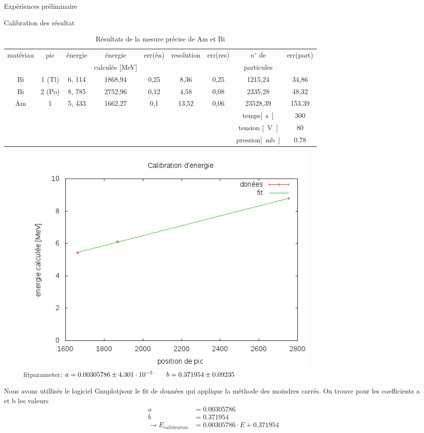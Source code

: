 \documentclass[a4paper,11pt]{scrartcl}
\begin{document}
\begin{section}{Expériences préliminaire}
  \begin{subsection}{Calibration des résultat}
   \begin{table}[htbp]
    \caption{Résultats de la mesure précise de Am et Bi}
    \begin{center}
     \begin{tabular}{|c||c||c||c|c|c|c|c|c|}
      \hline 
      matériau	&	pic	& énergie  &	énergie	&	err(én)	&	resolution	&	err(res)	&	$n^{\circ}$ de 	&	err(part)\\
      & & &calculée [MeV] & & &&  particules & \\ \hline\hline
      Bi 	&	1 (Tl)	&	 6, 114 &	1868,94	&	0,25	&	8,36	&	0,25	&	1215,24	&	34,86	\\ \hline
      Bi 	&	2 (Po)	&	 8, 785 &	2752,96	&	0,12	&	4,58	&	0,08	&	2335,28	&	48,32	\\ \hline
      Am	&	1	&	 5, 433 &	1662,27	&	0,1	&	13,52	&	0,06	&	23528,39	&	153,39	\\ \hline\hline
      \multicolumn{ 7}{|c|}{} & temps\unit{[s]} & 300 \\ \cline{ 8- 9}
      \multicolumn{7}{|c|}{} & tension \unit{[V]}& 80 \\ \cline{8-9}
      \multicolumn{ 7}{|c|}{} & pression\unit{[mb]}& 0.78 \\ \hline
     \end{tabular}
    \end{center}
   \end{table}
   \begin{figure}
    \begin{center}
     \includegraphics[width=0.75\textwidth]{Bilder/calibration.png}
     \caption[calibration d'énergie]{fitparameter: $ a = 0.00305786  \pm 4.301\cdot 10^{-5} \hspace{2 em} b = 0.371954  \pm 0.09235$ }
    \end{center}
   \end{figure}
  \end{subsection}
  Nous avons utillisés le logiciel \flqq Gnuplot\frqq \.pour le fit de données qui applique la méthode des moindres carrés. On trouve pour les coefficients a et b les valeurs
  \begin{align*}
   a&= 0.00305786 \\
   b&= 0.371954 \\
   \rightarrow E_{callibration} &= 0.00305786  \cdot E +0.371954 
  \end{align*}


\end{section}
\end{document}
